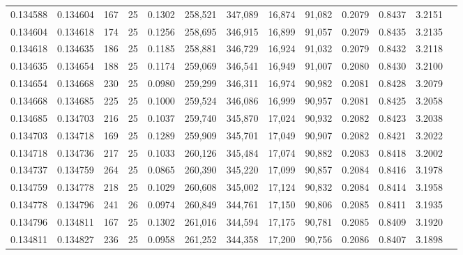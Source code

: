 \begin{tabular}{rrrrrrrrrrrrr}
0.134588 & 0.134604 &   167 &  25 &                                     0.1302 & 258,521 & 347,089 &  16,874 &  91,082 & 0.2079 & 0.8437 & 3.2151 \\
0.134604 & 0.134618 &   174 &  25 &                                     0.1256 & 258,695 & 346,915 &  16,899 &  91,057 & 0.2079 & 0.8435 & 3.2135 \\
0.134618 & 0.134635 &   186 &  25 &                                     0.1185 & 258,881 & 346,729 &  16,924 &  91,032 & 0.2079 & 0.8432 & 3.2118 \\
0.134635 & 0.134654 &   188 &  25 &                                     0.1174 & 259,069 & 346,541 &  16,949 &  91,007 & 0.2080 & 0.8430 & 3.2100 \\
0.134654 & 0.134668 &   230 &  25 &                                     0.0980 & 259,299 & 346,311 &  16,974 &  90,982 & 0.2081 & 0.8428 & 3.2079 \\
0.134668 & 0.134685 &   225 &  25 &                                     0.1000 & 259,524 & 346,086 &  16,999 &  90,957 & 0.2081 & 0.8425 & 3.2058 \\
0.134685 & 0.134703 &   216 &  25 &                                     0.1037 & 259,740 & 345,870 &  17,024 &  90,932 & 0.2082 & 0.8423 & 3.2038 \\
0.134703 & 0.134718 &   169 &  25 &                                     0.1289 & 259,909 & 345,701 &  17,049 &  90,907 & 0.2082 & 0.8421 & 3.2022 \\
0.134718 & 0.134736 &   217 &  25 &                                     0.1033 & 260,126 & 345,484 &  17,074 &  90,882 & 0.2083 & 0.8418 & 3.2002 \\
0.134737 & 0.134759 &   264 &  25 &                                     0.0865 & 260,390 & 345,220 &  17,099 &  90,857 & 0.2084 & 0.8416 & 3.1978 \\
0.134759 & 0.134778 &   218 &  25 &                                     0.1029 & 260,608 & 345,002 &  17,124 &  90,832 & 0.2084 & 0.8414 & 3.1958 \\
0.134778 & 0.134796 &   241 &  26 &                                     0.0974 & 260,849 & 344,761 &  17,150 &  90,806 & 0.2085 & 0.8411 & 3.1935 \\
0.134796 & 0.134811 &   167 &  25 &                                     0.1302 & 261,016 & 344,594 &  17,175 &  90,781 & 0.2085 & 0.8409 & 3.1920 \\
0.134811 & 0.134827 &   236 &  25 &                                     0.0958 & 261,252 & 344,358 &  17,200 &  90,756 & 0.2086 & 0.8407 & 3.1898 \\

\end{tabular}
